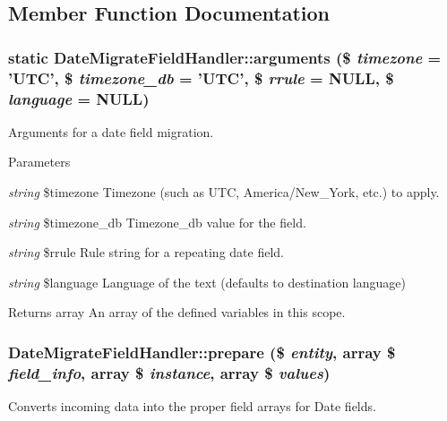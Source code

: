 \subsection{Member Function Documentation}
\hypertarget{classDateMigrateFieldHandler_a31f621fdb7e93f06530d8fb1ee2934ae}{
\subsubsection[{arguments}]{\setlength{\rightskip}{0pt plus 5cm}static DateMigrateFieldHandler::arguments (\$ {\em timezone} = {\ttfamily 'UTC'}, \/  \$ {\em timezone\_\-db} = {\ttfamily 'UTC'}, \/  \$ {\em rrule} = {\ttfamily NULL}, \/  \$ {\em language} = {\ttfamily NULL})}}
\label{classDateMigrateFieldHandler_a31f621fdb7e93f06530d8fb1ee2934ae}
Arguments for a date field migration.


\begin{DoxyParams}{Parameters}
\item[{\em string}]\$timezone Timezone (such as UTC, America/New\_\-York, etc.) to apply. \item[{\em string}]\$timezone\_\-db Timezone\_\-db value for the field. \item[{\em string}]\$rrule Rule string for a repeating date field. \item[{\em string}]\$language Language of the text (defaults to destination language)\end{DoxyParams}
\begin{DoxyReturn}{Returns}
array An array of the defined variables in this scope. 
\end{DoxyReturn}
\hypertarget{classDateMigrateFieldHandler_a25dc6470976ed92a402d367d5ebe6e94}{
\subsubsection[{prepare}]{\setlength{\rightskip}{0pt plus 5cm}DateMigrateFieldHandler::prepare (\$ {\em entity}, \/  array \$ {\em field\_\-info}, \/  array \$ {\em instance}, \/  array \$ {\em values})}}
\label{classDateMigrateFieldHandler_a25dc6470976ed92a402d367d5ebe6e94}
Converts incoming data into the proper field arrays for Date fields.


